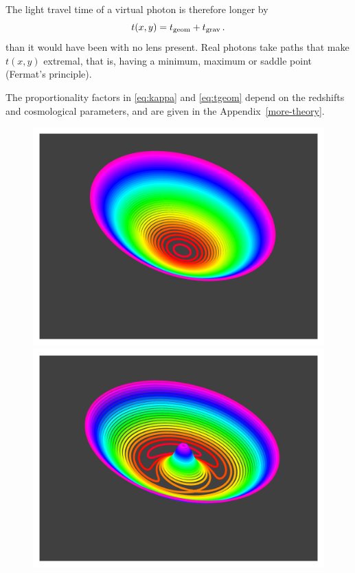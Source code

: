 The light travel time of a virtual photon is therefore longer by
\begin{equation}  \label{eq:tarriv}
t(x,y) = t_{\rm geom} + t_{\rm grav} \,.
\end{equation}
than it would have been with no lens present.  Real photons take paths
that make $t(x,y)$ extremal, that is, having a minimum, maximum or
saddle point (Fermat's principle).

The proportionality factors in \eqref{eq:kappa} and \eqref{eq:tgeom}
depend on the redshifts and cosmological parameters, and are given in
the Appendix~\ref{more-theory}.

\begin{figure}
\centering
\includegraphics[width=\columnwidth]{fig/arriv_0}
\includegraphics[width=\columnwidth]{fig/arriv_1}

\end{figure}
